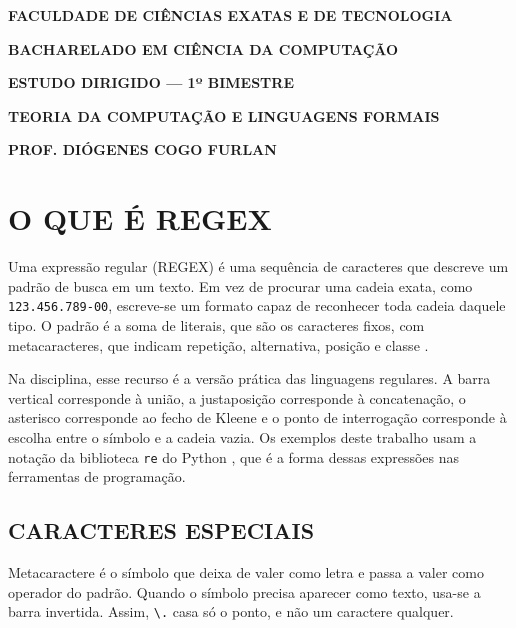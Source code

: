 \documentclass[
    12pt,
    oneside,
    a4paper,
    chapter=TITLE,
    section=TITLE,
    sumario=abnt-6027-2012
]{abntex2}
\renewcommand{\imprimircapa}{%
    \begin{capa}%
        \center
        {\bfseries\large\MakeUppercase{\imprimirinstituicao}\par}
        \vspace{0.4cm}
        {\bfseries\large\MakeUppercase{Faculdade de Ciências Exatas e de Tecnologia}\par}
        \vspace{0.4cm}
        {\bfseries\large\MakeUppercase{Bacharelado em Ciência da Computação}\par}
        \vspace*{1cm}

        {\bfseries\large\MakeUppercase{\imprimirautor}\par}
        \vfill

        {\bfseries\large\MakeUppercase{\imprimirtitulo}\par}
        \vfill

        {\bfseries\large\MakeUppercase{Estudo Dirigido --- 1º bimestre}\par}
        \vspace{0.4cm}
        {\bfseries\large\MakeUppercase{Teoria da Computação e Linguagens Formais}\par}
        \vspace{0.4cm}
        {\bfseries\large\MakeUppercase{Prof. Diógenes Cogo Furlan}\par}
        \vfill

        {\bfseries\large\MakeUppercase{\imprimirlocal}\par}
        {\bfseries\large\MakeUppercase{\imprimirdata}\par}
    \end{capa}
}
\begin{document}
\OnehalfSpacing
{}
\imprimircapa
\sumario
\textual

\chapter{O QUE É REGEX}
\label{cap:regex}

Uma expressão regular (REGEX) é uma sequência de caracteres que descreve um padrão de busca em um texto. Em vez de procurar uma cadeia exata, como \texttt{123.456.789-00}, escreve-se um formato capaz de reconhecer toda cadeia daquele tipo. O padrão é a soma de literais, que são os caracteres fixos, com metacaracteres, que indicam repetição, alternativa, posição e classe \cite{devmedia}.

Na disciplina, esse recurso é a versão prática das linguagens regulares. A barra vertical corresponde à união, a justaposição corresponde à concatenação, o asterisco corresponde ao fecho de Kleene e o ponto de interrogação corresponde à escolha entre o símbolo e a cadeia vazia. Os exemplos deste trabalho usam a notação da biblioteca \texttt{re} do Python \cite{pythonre}, que é a forma dessas expressões nas ferramentas de programação.

\section{CARACTERES ESPECIAIS}
\label{sec:especiais}

Metacaractere é o símbolo que deixa de valer como letra e passa a valer como operador do padrão. Quando o símbolo precisa aparecer como texto, usa-se a barra invertida. Assim, \verb|\.| casa só o ponto, e não um caractere qualquer.
\end{document}
